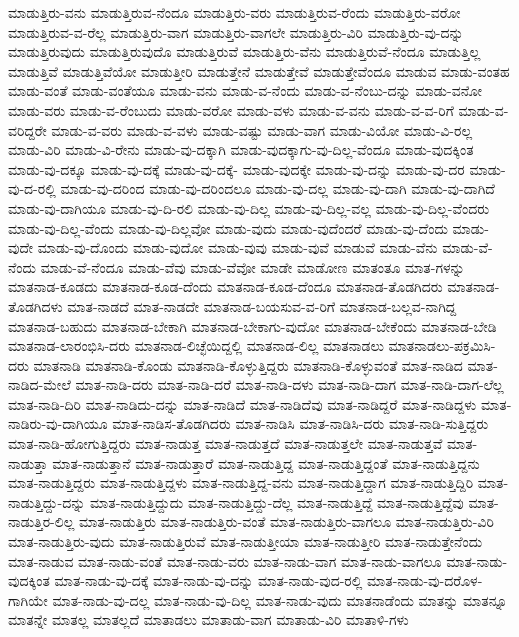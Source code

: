 {ಮಾಡುತ್ತಿರು-ವನು
ಮಾಡುತ್ತಿರುವ-ನೆಂದೂ
ಮಾಡುತ್ತಿರು-ವರು
ಮಾಡುತ್ತಿರುವ-ರೆಂದು
ಮಾಡುತ್ತಿರು-ವರೋ
ಮಾಡುತ್ತಿರುವ-ವ-ರೆಲ್ಲ
ಮಾಡುತ್ತಿರು-ವಾಗ
ಮಾಡುತ್ತಿರು-ವಾಗಲೇ
ಮಾಡುತ್ತಿರು-ವಿರಿ
ಮಾಡುತ್ತಿರು-ವು-ದನ್ನು
ಮಾಡುತ್ತಿರುವುದು
ಮಾಡುತ್ತಿರುವುದೊ
ಮಾಡುತ್ತಿರುವೆ
ಮಾಡುತ್ತಿರು-ವೆನು
ಮಾಡುತ್ತಿರುವೆ-ನೆಂದೂ
ಮಾಡುತ್ತಿಲ್ಲ
ಮಾಡುತ್ತಿವೆ
ಮಾಡುತ್ತಿವೆಯೋ
ಮಾಡುತ್ತೀರಿ
ಮಾಡುತ್ತೇನೆ
ಮಾಡುತ್ತೇವೆ
ಮಾಡುತ್ತೇವೆಂದೂ
ಮಾಡುವ
ಮಾಡು-ವಂತಹ
ಮಾಡು-ವಂತೆ
ಮಾಡು-ವಂತೆಯೂ
ಮಾಡು-ವನು
ಮಾಡು-ವ-ನೆಂದು
ಮಾಡು-ವ-ನೆಂಬು-ದನ್ನು
ಮಾಡು-ವನೋ
ಮಾಡು-ವರು
ಮಾಡು-ವ-ರೆಂಬುದು
ಮಾಡು-ವರೋ
ಮಾಡು-ವಳು
ಮಾಡು-ವ-ವನು
ಮಾಡು-ವ-ವ-ರಿಗೆ
ಮಾಡು-ವ-ವರಿದ್ದರೇ
ಮಾಡು-ವ-ವರು
ಮಾಡು-ವ-ವಳು
ಮಾಡು-ವಷ್ಟು
ಮಾಡು-ವಾಗ
ಮಾಡು-ವಿಯೋ
ಮಾಡು-ವಿ-ರಲ್ಲ
ಮಾಡು-ವಿರಿ
ಮಾಡು-ವಿ-ರೇನು
ಮಾಡು-ವು-ದಕ್ಕಾಗಿ
ಮಾಡು-ವುದಕ್ಕಾಗು-ವು-ದಿಲ್ಲ-ವೆಂದೂ
ಮಾಡು-ವುದಕ್ಕಿಂತ
ಮಾಡು-ವು-ದಕ್ಕೂ
ಮಾಡು-ವು-ದಕ್ಕೆ
ಮಾಡು-ವು-ದಕ್ಕೆ-
ಮಾಡು-ವುದಕ್ಕೇ
ಮಾಡು-ವು-ದನ್ನು
ಮಾಡು-ವು-ದರ
ಮಾಡು-ವು-ದ-ರಲ್ಲಿ
ಮಾಡು-ವು-ದರಿಂದ
ಮಾಡು-ವು-ದರಿಂದಲೂ
ಮಾಡು-ವು-ದಲ್ಲ
ಮಾಡು-ವು-ದಾಗಿ
ಮಾಡು-ವು-ದಾಗಿದೆ
ಮಾಡು-ವು-ದಾಗಿಯೂ
ಮಾಡು-ವು-ದಿ-ರಲಿ
ಮಾಡು-ವು-ದಿಲ್ಲ
ಮಾಡು-ವು-ದಿಲ್ಲ-ವಲ್ಲ
ಮಾಡು-ವು-ದಿಲ್ಲ-ವೆಂದರು
ಮಾಡು-ವು-ದಿಲ್ಲ-ವೆಂದು
ಮಾಡು-ವು-ದಿಲ್ಲವೋ
ಮಾಡು-ವುದು
ಮಾಡು-ವುದೆಂದರೆ
ಮಾಡು-ವು-ದೆಂದು
ಮಾಡು-ವುದೇ
ಮಾಡು-ವು-ದೊಂದು
ಮಾಡು-ವುದೋ
ಮಾಡು-ವುವು
ಮಾಡು-ವುವೆ
ಮಾಡುವೆ
ಮಾಡು-ವೆನು
ಮಾಡು-ವೆ-ನೆಂದು
ಮಾಡು-ವೆ-ನೆಂದೂ
ಮಾಡು-ವೆವು
ಮಾಡು-ವೆವೋ
ಮಾಡೇ
ಮಾಡೋಣ
ಮಾತಂತೂ
ಮಾತ-ಗಳನ್ನು
ಮಾತನಾಡ-ಕೂಡದು
ಮಾತನಾಡ-ಕೂಡ-ದೆಂದು
ಮಾತನಾಡ-ಕೂಡ-ದೆಂದೂ
ಮಾತನಾಡ-ತೊಡಗಿದರು
ಮಾತನಾಡ-ತೊಡಗಿದಳು
ಮಾತ-ನಾಡದೆ
ಮಾತ-ನಾಡದೇ
ಮಾತನಾಡ-ಬಯಸುವ-ವ-ರಿಗೆ
ಮಾತನಾಡ-ಬಲ್ಲವ-ನಾಗಿದ್ದ
ಮಾತನಾಡ-ಬಹುದು
ಮಾತನಾಡ-ಬೇಕಾಗಿ
ಮಾತನಾಡ-ಬೇಕಾಗು-ವುದೋ
ಮಾತನಾಡ-ಬೇಕೆಂದು
ಮಾತನಾಡ-ಬೇಡಿ
ಮಾತನಾಡ-ಲಾರಂಭಿಸಿ-ದರು
ಮಾತನಾಡ-ಲಿಚ್ಛೆಯಿದ್ದಲ್ಲಿ
ಮಾತನಾಡ-ಲಿಲ್ಲ
ಮಾತನಾಡಲು
ಮಾತನಾಡಲು-ಪಕ್ರಮಿಸಿ-ದರು
ಮಾತನಾಡಿ
ಮಾತನಾಡಿ-ಕೊಂಡು
ಮಾತನಾಡಿ-ಕೊಳ್ಳುತ್ತಿದ್ದರು
ಮಾತನಾಡಿ-ಕೊಳ್ಳುವಂತೆ
ಮಾತ-ನಾಡಿದ
ಮಾತ-ನಾಡಿದ-ಮೇಲೆ
ಮಾತ-ನಾಡಿ-ದರು
ಮಾತ-ನಾಡಿ-ದರೆ
ಮಾತ-ನಾಡಿ-ದಳು
ಮಾತ-ನಾಡಿ-ದಾಗ
ಮಾತ-ನಾಡಿ-ದಾಗ-ಲೆಲ್ಲ
ಮಾತ-ನಾಡಿ-ದಿರಿ
ಮಾತ-ನಾಡಿದು-ದನ್ನು
ಮಾತ-ನಾಡಿದೆ
ಮಾತ-ನಾಡಿದೆವು
ಮಾತ-ನಾಡಿದ್ದರೆ
ಮಾತ-ನಾಡಿದ್ದಳು
ಮಾತ-ನಾಡಿರು-ವು-ದಾಗಿಯೂ
ಮಾತ-ನಾಡಿಸ-ತೊಡಗಿದರು
ಮಾತ-ನಾಡಿಸಿ
ಮಾತ-ನಾಡಿಸಿ-ದರು
ಮಾತ-ನಾಡಿ-ಸುತ್ತಿದ್ದರು
ಮಾತ-ನಾಡಿ-ಹೋಗುತ್ತಿದ್ದರು
ಮಾತ-ನಾಡುತ್ತ
ಮಾತ-ನಾಡುತ್ತದೆ
ಮಾತ-ನಾಡುತ್ತಲೇ
ಮಾತ-ನಾಡುತ್ತವೆ
ಮಾತ-ನಾಡುತ್ತಾ
ಮಾತ-ನಾಡುತ್ತಾನೆ
ಮಾತ-ನಾಡುತ್ತಾರೆ
ಮಾತ-ನಾಡುತ್ತಿದ್ದ
ಮಾತ-ನಾಡುತ್ತಿದ್ದಂತೆ
ಮಾತ-ನಾಡುತ್ತಿದ್ದನು
ಮಾತ-ನಾಡುತ್ತಿದ್ದರು
ಮಾತ-ನಾಡುತ್ತಿದ್ದಳು
ಮಾತ-ನಾಡುತ್ತಿದ್ದ-ವನು
ಮಾತ-ನಾಡುತ್ತಿದ್ದಾಗ
ಮಾತ-ನಾಡುತ್ತಿದ್ದಿರಿ
ಮಾತ-ನಾಡುತ್ತಿದ್ದು-ದನ್ನು
ಮಾತ-ನಾಡುತ್ತಿದ್ದುದು
ಮಾತ-ನಾಡುತ್ತಿದ್ದು-ದೆಲ್ಲ
ಮಾತ-ನಾಡುತ್ತಿದ್ದೆ
ಮಾತ-ನಾಡುತ್ತಿದ್ದೆವು
ಮಾತ-ನಾಡುತ್ತಿರ-ಲಿಲ್ಲ
ಮಾತ-ನಾಡುತ್ತಿರು
ಮಾತ-ನಾಡುತ್ತಿರು-ವಂತೆ
ಮಾತ-ನಾಡುತ್ತಿರು-ವಾಗಲೂ
ಮಾತ-ನಾಡುತ್ತಿರು-ವಿರಿ
ಮಾತ-ನಾಡುತ್ತಿರು-ವುದು
ಮಾತ-ನಾಡುತ್ತಿರುವೆ
ಮಾತ-ನಾಡುತ್ತೀಯಾ
ಮಾತ-ನಾಡುತ್ತೀರಿ
ಮಾತ-ನಾಡುತ್ತೇನೆಂದು
ಮಾತ-ನಾಡುವ
ಮಾತ-ನಾಡು-ವಂತೆ
ಮಾತ-ನಾಡು-ವರು
ಮಾತ-ನಾಡು-ವಾಗ
ಮಾತ-ನಾಡು-ವಾಗಲೂ
ಮಾತ-ನಾಡು-ವುದಕ್ಕಿಂತ
ಮಾತ-ನಾಡು-ವು-ದಕ್ಕೆ
ಮಾತ-ನಾಡು-ವು-ದನ್ನು
ಮಾತ-ನಾಡು-ವುದ-ರಲ್ಲಿ
ಮಾತ-ನಾಡು-ವು-ದರೊಳ-ಗಾಗಿಯೇ
ಮಾತ-ನಾಡು-ವು-ದಲ್ಲ
ಮಾತ-ನಾಡು-ವು-ದಿಲ್ಲ
ಮಾತ-ನಾಡು-ವುದು
ಮಾತನಾಡೆಂದು
ಮಾತನ್ನು
ಮಾತನ್ನೂ
ಮಾತನ್ನೇ
ಮಾತಲ್ಲ
ಮಾತಲ್ಲದೆ
ಮಾತಾಡಲು
ಮಾತಾಡು-ವಾಗ
ಮಾತಾಡು-ವಿರಿ
ಮಾತಾಳಿ-ಗಳು
}
